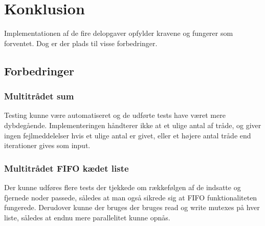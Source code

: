 \section{Konklusion}
Implementationen af de fire delopgaver opfylder kravene og fungerer som forventet. Dog er der plads til visse forbedringer. 


\subsection{Forbedringer}

\subsubsection{Multitrådet sum}
Testing kunne være automatiseret og de udførte tests have været mere dybdegående. Implementeringen håndterer ikke at et ulige antal af tråde, og giver ingen fejlmeddelelser hvis et ulige antal er givet, eller et højere antal tråde end iterationer gives som input.

\subsubsection{Multitrådet FIFO kædet liste}
Der kunne udføres flere tests der tjekkede om rækkefølgen af de indsatte og fjernede noder passede, således at man også sikrede sig at FIFO funktionaliteten fungerede. Derudover kunne der bruges der bruges read og write mutexes på hver liste, således at endnu mere parallelitet kunne opnås.